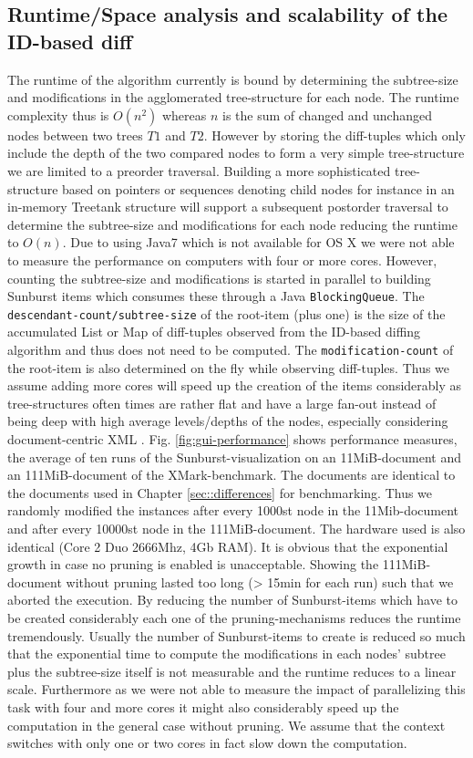 \subsection{Runtime/Space analysis and scalability of the ID-based diff}
The runtime of the algorithm currently is bound by determining the subtree-size and modifications in the agglomerated tree-structure for each node. The runtime complexity thus is $O(n^2)$ whereas $n$ is the sum of changed and unchanged nodes between two trees $T1$ and $T2$. However by storing the diff-tuples which only include the depth of the two compared nodes to form a very simple tree-structure we are limited to a preorder traversal. Building a more sophisticated tree-structure based on pointers or sequences denoting child nodes for instance in an in-memory Treetank structure will support a subsequent postorder traversal to determine the subtree-size and modifications for each node reducing the runtime to $O(n)$. Due to using Java7 which is not available for OS X we were not able to measure the performance on computers with four or more cores. However, counting the subtree-size and modifications is started in parallel to building Sunburst items which consumes these through a Java \texttt{BlockingQueue}. The \texttt{descendant-count/subtree-size} of the root-item (plus one) is the size of the accumulated List or Map of diff-tuples observed from the ID-based diffing algorithm and thus does not need to be computed. The \texttt{modification-count} of the root-item is also determined on the fly while observing diff-tuples. Thus we assume adding more cores will speed up the creation of the items considerably as tree-structures often times are rather flat and have a large fan-out instead of being deep with high average levels/depths of the nodes, especially considering document-centric XML \cite{ronnau2009efficient}. Fig. \ref{fig:gui-performance} shows performance measures, the average of ten runs of the Sunburst-visualization on an 11MiB-document and an 111MiB-document of the XMark-benchmark.  The documents are identical to the documents used in Chapter \ref{sec::differences} for benchmarking. Thus we randomly modified the instances after every 1000st node in the 11Mib-document and after every 10000st node in the 111MiB-document. The hardware used is also identical (Core 2 Duo 2666Mhz, 4Gb RAM). It is obvious that the exponential growth in case no pruning is enabled is unacceptable. Showing the 111MiB-document without pruning lasted too long (> 15min for each run) such that we aborted the execution. By reducing the number of Sunburst-items which have to be created considerably each one of the pruning-mechanisms reduces the runtime tremendously. Usually the number of Sunburst-items to create is reduced so much that the exponential time to compute the modifications in each nodes' subtree plus the subtree-size itself is not measurable and the runtime reduces to a linear scale. Furthermore as we were not able to measure the impact of parallelizing this task with four and more cores it might also considerably speed up the computation in the general case without pruning. We assume that the context switches with only one or two cores in fact slow down the computation. 

